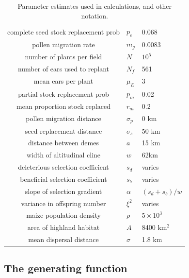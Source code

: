 \begin{table}[htb!!]
  \begin{center}
  \begin{tabular}{|cll|}
    \hline
    complete seed stock replacement prob & $p_e$     & 0.068 \\
    pollen migration rate                & $m_g$      & 0.0083 \\
    number of plants per field           & $N$        & $10^5$ \\
    number of ears used to replant       & $N_f$      & 561 \\
    mean ears per plant                  & $\mu_E$    & 3 \\
    partial stock replacement prob       & $p_m$      & 0.02 \\
    mean proportion stock replaced       & $r_m$      & 0.2 \\
    pollen migration distance            & $\sigma_p$ & 0 km \\
    seed replacement distance            & $\sigma_s$ & 50 km \\
    distance between demes               & $a$        & 15 km \\
    width of altitudinal cline           & $w$        & 62km \\
    deleterious selection coefficient    & $s_d$      & varies \\
    beneficial selection coefficient     & $s_b$      & varies \\
    slope of selection gradient          & $\alpha$   & $(s_d+s_b)/w$ \\
    variance in offspring number         & $\xi^2$    & varies \\
    maize population density             & $\rho$     & $5 \times 10^3$ \\
    area of highland habitat             & $A$        & 8400 km$^2$ \\
    mean dispersal distance              & $\sigma$   & 1.8 km \\
    \hline 
  \end{tabular}
\end{center}
  \caption{Parameter estimates used in calculations, and other notation.
  \label{tab:parameters}
  }
\end{table}


\subsection*{The generating function}

